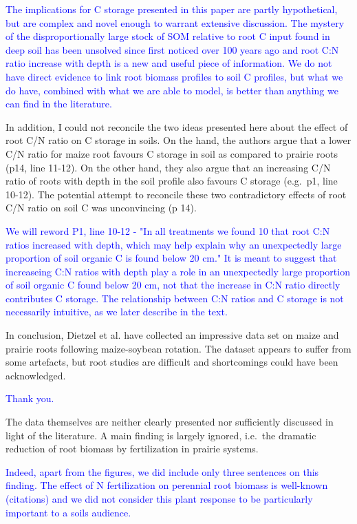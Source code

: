 \documentclass[]{article}
\begin{document}
\textcolor{blue}{The implications for C storage presented in this paper are partly hypothetical, but are complex and novel enough to warrant extensive discussion. The mystery of the disproportionally large stock of SOM relative to root C input found in deep soil has been unsolved since first noticed over 100 years ago and root C:N ratio increase with depth is a new and useful piece of information. We do not have direct evidence to link root biomass profiles to soil C profiles, but what we do have, combined with what we are able to model, is better than anything we can find in the literature.}

In addition, I could not reconcile the two ideas presented here about
the effect of root C/N ratio on C storage in soils. On the hand, the
authors argue that a lower C/N ratio for maize root favours C storage in
soil as compared to prairie roots (p14, line 11-12). On the other hand,
they also argue that an increasing C/N ratio of roots with depth in the
soil profile also favours C storage (e.g.~p1, line 10-12). The potential
attempt to reconcile these two contradictory effects of root C/N ratio
on soil C was unconvincing (p 14).

\textcolor{blue}{We will reword P1, line 10-12 - "In all treatments we found 10 that root C:N ratios increased with depth, which may help explain why an unexpectedly large proportion of soil organic C is found below 20 cm." It is meant to suggest that increaseing C:N ratios with depth play a role in an unexpectedly large proportion of soil organic C found below 20 cm, not that the increase in C:N ratio directly contributes C storage. The relationship between C:N ratios and C storage is not necessarily intuitive, as we later describe in the text.}

In conclusion, Dietzel et al. have collected an impressive data set on
maize and prairie roots following maize-soybean rotation. The dataset
appears to suffer from some artefacts, but root studies are difficult
and shortcomings could have been acknowledged.

\textcolor{blue}{Thank you.}

The data themselves are neither clearly presented nor sufficiently
discussed in light of the literature. A main finding is largely ignored,
i.e.~the dramatic reduction of root biomass by fertilization in prairie
systems.

\textcolor{blue}{Indeed, apart from the figures, we did include only three sentences on this finding. The effect of N fertilization on perennial root biomass is well-known (citations) and we did not consider this plant response to be particularly important to a soils audience.}
\end{document}
